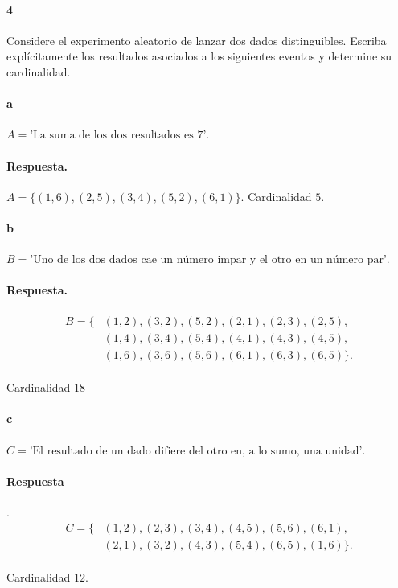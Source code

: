 \documentclass{article}
\begin{document}
\paragraph{4} Considere el experimento aleatorio de lanzar dos dados distinguibles. Escriba explícitamente los resultados asociados a los siguientes eventos y determine su cardinalidad.
\paragraph{a} $A = \text{'La suma de los dos resultados es 7'}$.
\paragraph{Respuesta.} $A = \{ (1,6), (2,5), (3,4), (5,2), (6,1) \}.$ Cardinalidad $5$.
\paragraph{b} $B = \text{'Uno de los dos dados cae un número impar y el otro en un número par'}$.
\paragraph{Respuesta.}
\begin{align*}
    B = \{ &(1,2), (3,2), (5,2), (2,1), (2,3), (2,5),\\
           &(1,4), (3,4), (5,4), (4,1), (4,3), (4,5),\\
           &(1,6), (3,6), (5,6), (6,1), (6,3), (6,5) \}.
\end{align*}
\paragraph{} Cardinalidad $18$
\paragraph{c} $C = \text{'El resultado de un dado difiere del otro en, a lo sumo, una unidad'}$.
\paragraph{Respuesta}.
\begin{align*}
    C = \{ &(1,2), (2,3), (3,4), (4,5), (5,6), (6,1),\\
           &(2,1), (3,2), (4,3), (5,4), (6,5), (1,6)\}.
\end{align*}
\paragraph{} Cardinalidad $12$.
\end{document}
